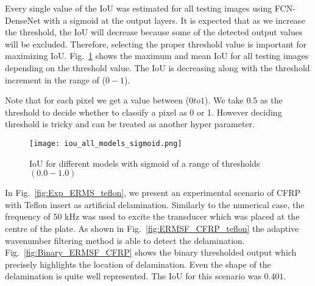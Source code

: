 Every single value of the IoU was estimated for all testing images using FCN-DenseNet with a sigmoid at the output layers.
It is expected that as we increase the threshold, the IoU will decrease because some of the detected output values will be excluded.
Therefore, selecting the proper threshold value is important for maximizing IoU. 
Fig.~\ref{fig:iou_fcn} shows the maximum and mean IoU for all testing images depending on the threshold value. 
The IoU is decreasing along with the threshold increment in the range of (\(0-1\)).

Note that for each pixel we get a value between (\(0 to 1\)).
We take 0.5 as the threshold to decide whether to classify a pixel as 0 or 1.
However deciding threshold is tricky and can be treated as another hyper parameter.

	\begin{figure}[!h] 
		\centering
		\texttt{[image: iou\_all\_models\_sigmoid.png]}
		\centering
		\caption{IoU for different models with sigmoid of a range of thresholds \((0.0-1.0)\)} 
		\label{fig:iou_fcn}
	\end{figure}
	
In Fig.~\ref{fig:Exp_ERMS_teflon}, we present an experimental scenario of CFRP with Teflon insert as artificial delamination.
Similarly to the numerical case, the frequency of \(50\) kHz was used to excite the transducer which was placed at the centre of the plate.
As shown in Fig.~\ref{fig:ERMSF_CFRP_teflon} the adaptive wavenumber filtering method is able to detect the delamination. 
Fig.~\ref{fig:Binary_ERMSF_CFRP} shows the binary thresholded output which precisely highlights the location of delamination. 
Even the shape of the delamination is quite well represented.
The IoU for this scenario was \(0.401\). 


